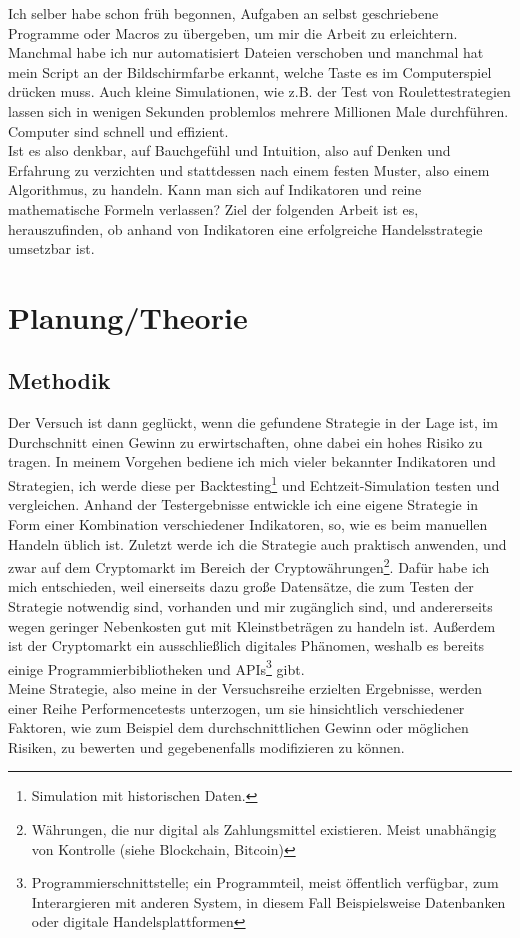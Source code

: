 \documentclass[12pt]{article}
\begin{document}
	Ich selber habe schon früh begonnen, Aufgaben an selbst geschriebene Programme oder Macros zu übergeben, um mir die Arbeit zu erleichtern. Manchmal habe ich nur automatisiert Dateien verschoben und manchmal hat mein Script an der Bildschirmfarbe erkannt, welche Taste es im Computerspiel drücken muss. Auch kleine Simulationen, wie z.B. der Test von Roulettestrategien lassen sich in wenigen Sekunden problemlos mehrere Millionen Male durchführen. Computer sind schnell und effizient.\\
	Ist es also denkbar, auf Bauchgefühl und Intuition, also auf Denken und Erfahrung zu verzichten und stattdessen nach einem festen Muster, also einem Algorithmus, zu handeln. Kann man sich auf Indikatoren und reine mathematische Formeln verlassen? Ziel der folgenden Arbeit ist es, herauszufinden, ob anhand von Indikatoren eine erfolgreiche Handelsstrategie umsetzbar ist.
	
\section{Planung/Theorie}
\subsection{Methodik}
	Der Versuch ist dann geglückt, wenn die gefundene Strategie in der Lage ist, im Durchschnitt einen Gewinn zu erwirtschaften, ohne dabei ein hohes Risiko zu tragen. In meinem Vorgehen bediene ich mich vieler bekannter Indikatoren und Strategien, ich werde diese per Backtesting\footnote{Simulation mit historischen Daten.} und Echtzeit-Simulation testen und vergleichen. Anhand der Testergebnisse entwickle ich eine eigene Strategie in Form einer Kombination verschiedener Indikatoren, so, wie es beim manuellen Handeln üblich ist. Zuletzt werde ich die Strategie auch praktisch anwenden, und zwar auf dem Cryptomarkt im Bereich der Cryptowährungen\footnote{Währungen, die nur digital als Zahlungsmittel existieren. Meist unabhängig von Kontrolle (siehe Blockchain, Bitcoin)}. Dafür habe ich mich entschieden, weil einerseits dazu große Datensätze, die zum Testen der Strategie notwendig sind, vorhanden und mir zugänglich sind, und andererseits wegen geringer Nebenkosten gut mit Kleinstbeträgen zu handeln ist. Außerdem ist der Cryptomarkt ein ausschließlich digitales Phänomen, weshalb es bereits einige Programmierbibliotheken und APIs\footnote{\glqq Programmierschnittstelle\grqq{}; ein Programmteil, meist öffentlich verfügbar, zum Interargieren mit anderen System, in diesem Fall Beispielsweise Datenbanken oder digitale Handelsplattformen} gibt.\\
	Meine Strategie, also meine in der Versuchsreihe erzielten Ergebnisse, werden einer Reihe Performencetests unterzogen, um sie hinsichtlich verschiedener Faktoren, wie zum Beispiel dem durchschnittlichen Gewinn oder möglichen Risiken, zu bewerten und gegebenenfalls modifizieren zu können.\\
\end{document}
